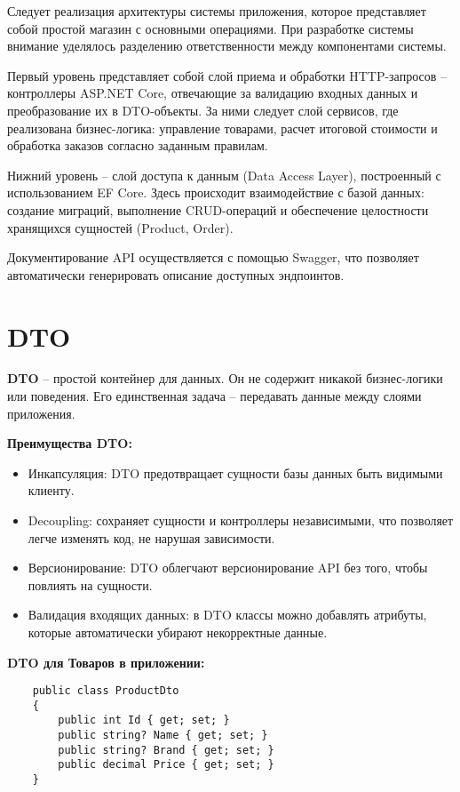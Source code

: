 \documentclass[a4paper,12pt]{report}
\begin{document}
Следует реализация архитектуры системы приложения, которое представляет собой простой магазин с основными операциями. 
При разработке системы внимание уделялось разделению ответственности между компонентами системы.

Первый уровень представляет собой слой приема и обработки \acs{HTTP}-запросов -- контроллеры ASP.NET Core, 
отвечающие за валидацию входных данных и преобразование их в \acs{DTO}-объекты. 
За ними следует слой сервисов, где реализована бизнес-логика: управление товарами, расчет итоговой стоимости 
и обработка заказов согласно заданным правилам.

Нижний уровень -- слой доступа к данным (Data Access Layer), построенный с использованием \acs{EF} Core. 
Здесь происходит взаимодействие с базой данных: создание миграций, выполнение \acs{CRUD}-операций и 
обеспечение целостности хранящихся сущностей (Product, Order).

Документирование \acs{API} осуществляется с помощью Swagger, что позволяет автоматически генерировать описание доступных эндпоинтов.

\section{\acs{DTO}}

\textbf{\acs{DTO}} -- простой контейнер для данных. Он не содержит никакой бизнес-логики или поведения.
Его единственная задача -- передавать данные между слоями приложения.

\textbf{Преимущества \acs{DTO}:}
\begin{itemize}
    \item
        Инкапсуляция: \acs{DTO} предотвращает сущности базы данных быть видимыми клиенту.
    \item
        Decoupling: сохраняет сущности и контроллеры независимыми, что позволяет легче изменять
        код, не нарушая зависимости.
    \item
        Версионирование: \acs{DTO} облегчают версионирование \acs{API} без того, чтобы повлиять на сущности.
    \item
        Валидация входящих данных: в \acs{DTO} классы можно добавлять атрибуты, которые автоматически убирают 
        некорректные данные.\cite{dto}
\end{itemize}

\textbf{\acs{DTO} для Товаров в приложении:}

\begin{verbatim}
    public class ProductDto
    {
        public int Id { get; set; } 
        public string? Name { get; set; }
        public string? Brand { get; set; }
        public decimal Price { get; set; }
    }
\end{verbatim}
\end{document}
